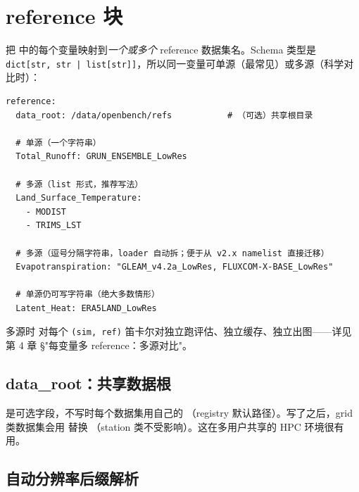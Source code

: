 \section{reference 块}

 把  中的每个变量映射到\emph{一个或多个} reference 数据集名。Schema 类型是 \texttt{dict[str, str | list[str]]}，所以同一变量可单源（最常见）或多源（科学对比时）：

\begin{verbatim}
reference:
  data_root: /data/openbench/refs           # （可选）共享根目录

  # 单源（一个字符串）
  Total_Runoff: GRUN_ENSEMBLE_LowRes

  # 多源（list 形式，推荐写法）
  Land_Surface_Temperature:
    - MODIST
    - TRIMS_LST

  # 多源（逗号分隔字符串，loader 自动拆；便于从 v2.x namelist 直接迁移）
  Evapotranspiration: "GLEAM_v4.2a_LowRes, FLUXCOM-X-BASE_LowRes"

  # 单源仍可写字符串（绝大多数情形）
  Latent_Heat: ERA5LAND_LowRes
\end{verbatim}

多源时 \openbench{} 对每个 \texttt{(sim, ref)} 笛卡尔对独立跑评估、独立缓存、独立出图——详见第 4 章 §"每变量多 reference：多源对比"。



\subsection{data\_root：共享数据根}

 是可选字段，不写时每个数据集用自己的 （registry 默认路径）。写了之后，grid 类数据集会用  替换 （station 类不受影响）。这在多用户共享的 HPC 环境很有用。

\subsection{自动分辨率后缀解析}

